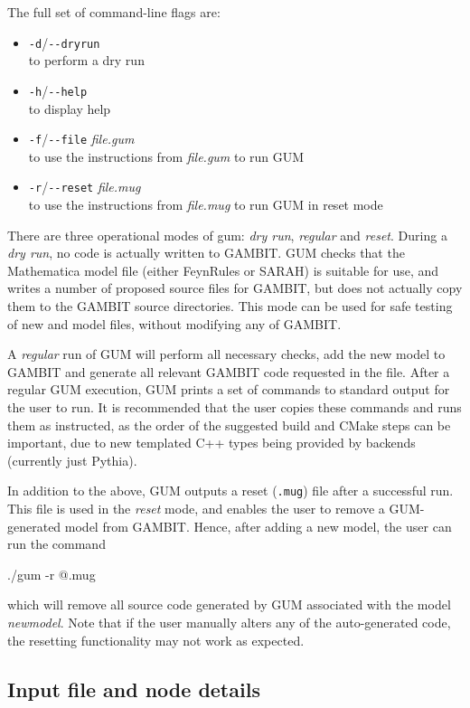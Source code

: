 \documentclass[pdftex,twocolumn,epjc3_preprint,runningheads]{svjour3}
\renewcommand{\_}{\discretionary{\underscore}{}{\underscore}}
\newcommand\term[1]{{\lstset{style=terminal}\lstinline!#1!\lstset{style=cpp}}}
\newcommand\textinline[1]{{{\lstset{style=text}\lstinline!#1!}}}
\newcommand{\metavarf}[1]{\textit{\color{darkgreen}\footnotesize\textrm{#1}}}
\newcommand{\metavar}{\metavarf}
\newcommand{\gambit}{\textsf{GAMBIT}\xspace}
\newcommand{\GB}{\gambit}
\newcommand{\pythia}{\textsf{Pythia}\xspace}
\newcommand\Mathematica{\textsf{Mathematica}\xspace}
\newcommand{\gum}{\textsf{GUM}\xspace}
\newcommand{\dgum}{\!\!\term{.gum}\!\xspace}
\newcommand{\fr}{\textsf{FeynRules}\xspace}
\newcommand{\sarah}{\textsf{SARAH}\xspace}
\newcommand\cmake{\textsf{CMake}\xspace}
\newcommand{\nm}{\metavar{new\_model}}
\begin{document}
The full set of command-line flags are:
%
\begin{itemize}
\item[] \term{-d}/\term{--dryrun} \\
      to perform a dry run
\item[] \term{-h}/\textinline{--help} \\
      to display help
\item[] \term{-f}/\term{--file} \metavar{file.gum} \\
      to use the instructions from \metavar{file.gum} to run \gum
\item[] \term{-r}/\term{--reset} \metavar{file.mug} \\
      to use the instructions from \metavar{file.mug} to run \gum in reset mode
\end{itemize}
%
There are three operational modes of gum: \textit{dry run}, \textit{regular} and \textit{reset}. During a \textit{dry run}, no code is actually written to \GB.  \gum checks that the \Mathematica model file (either \fr or \sarah) is suitable for use, and writes a number of proposed source files for \GB,  but does not actually copy them to the \GB source directories.  This mode can be used for safe testing of new \dgum and model files, without modifying any of \GB.

A \textit{regular} run of \gum will perform all necessary checks, add the new model to \GB and generate all relevant \GB code requested in the \dgum file. After a regular \gum execution, \gum prints a set of commands to standard output for the user to run. It is recommended that the user copies these commands and runs them as instructed, as the order of the suggested build and \cmake steps can be important, due to new templated \textsf{C++} types being provided by backends (currently just \pythia).

In addition to the above, \gum outputs a reset (\term{.mug}) file after a successful run. This file is used in the \textit{reset} mode, and enables the user to remove a \gum-generated model from \GB. Hence, after adding a new model, the user can run the command
%
\begin{lstterm}
./gum -r @\nm@.mug
\end{lstterm}
%
which will remove all source code generated by \gum associated with the model \nm. Note that if the user manually alters any of the auto-generated code, the resetting functionality may not work as expected.


\subsection{Input file and node details} \label{sec:gumfile}
\end{document}

